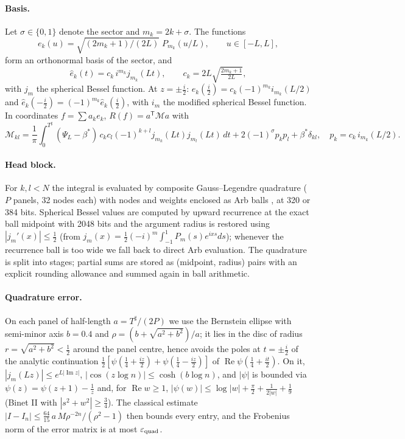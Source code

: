 \documentclass[11pt,a4paper]{article}
\theoremstyle{remark}
\theoremstyle{definition}
\renewcommand{\Re}{\operatorname{Re}}
\renewcommand{\Im}{\operatorname{Im}}
\newcommand{\eps}{\varepsilon}
\begin{document}
\paragraph{Basis.} Let $\sigma\in\{0,1\}$ denote the sector and $m_k=2k+\sigma$. The functions
\[e_k(u)=\sqrt{(2m_k+1)/(2L)}\;P_{m_k}(u/L),\qquad u\in[-L,L],\]
form an orthonormal basis of the sector, and
\[
\hat e_k(t)=c_k\, i^{m_k} j_{m_k}(Lt),\qquad c_k=2L\sqrt{\tfrac{2m_k+1}{2L}},
\]
with $j_m$ the spherical Bessel function. At $z=\pm\frac i2$: $\hat e_k(\tfrac i2)=c_k(-1)^{m_k} i_{m_k}(L/2)$ and $\hat e_k(-\tfrac i2)=(-1)^{m_k}\hat e_k(\tfrac i2)$, with $i_m$ the modified spherical Bessel function. In coordinates $f=\sum a_ke_k$, $R(f)=a^{\mathsf T}\mathcal M a$ with
\[
\mathcal M_{kl}=\frac1\pi\int_0^{T^\sharp}(\Psi_L-\beta^*)\,c_kc_l(-1)^{k+l}j_{m_k}(Lt)j_{m_l}(Lt)\,dt+2(-1)^\sigma p_kp_l+\beta^*\delta_{kl},\quad p_k=c_k\,i_{m_k}(L/2).
\]

\paragraph{Head block.} For $k,l<N$ the integral is evaluated by composite Gauss--Legendre quadrature ($P$ panels, 32 nodes each) with nodes and weights enclosed as Arb balls \cite{Johansson17}, at 320 or 384 bits. Spherical Bessel values are computed by upward recurrence at the exact ball midpoint with 2048 bits and the argument radius is restored using $|j_m'(x)|\le\frac12$ (from $j_m(x)=\frac12(-i)^m\int_{-1}^1P_m(s)e^{ixs}ds$); whenever the recurrence ball is too wide we fall back to direct Arb evaluation. The quadrature is split into stages; partial sums are stored as (midpoint, radius) pairs with an explicit rounding allowance and summed again in ball arithmetic.

\paragraph{Quadrature error.} On each panel of half-length $a=T^\sharp/(2P)$ we use the Bernstein ellipse with semi-minor axis $b=0.4$ and $\rho=(b+\sqrt{a^2+b^2})/a$; it lies in the disc of radius $r=\sqrt{a^2+b^2}<\frac12$ around the panel centre, hence avoids the poles at $t=\pm\frac i2$ of the analytic continuation $\frac12[\psi(\frac14+\frac{iz}2)+\psi(\frac14-\frac{iz}2)]$ of $\Re\psi(\frac14+\frac{it}2)$. On it, $|j_m(Lz)|\le e^{L|\Im z|}$, $|\cos(z\log n)|\le\cosh(b\log n)$, and $|\psi|$ is bounded via $\psi(z)=\psi(z+1)-\frac1z$ and, for $\Re w\ge1$, $|\psi(w)|\le\log|w|+\frac\pi2+\frac1{2|w|}+\frac19$ (Binet II with $|s^2+w^2|\ge\frac34$). The classical estimate $|I-I_n|\le\frac{64}{15}\,a\,M\rho^{-2n}/(\rho^2-1)$ \cite{Trefethen13} then bounds every entry, and the Frobenius norm of the error matrix is at most $\eps_{\rm quad}$.
\end{document}
